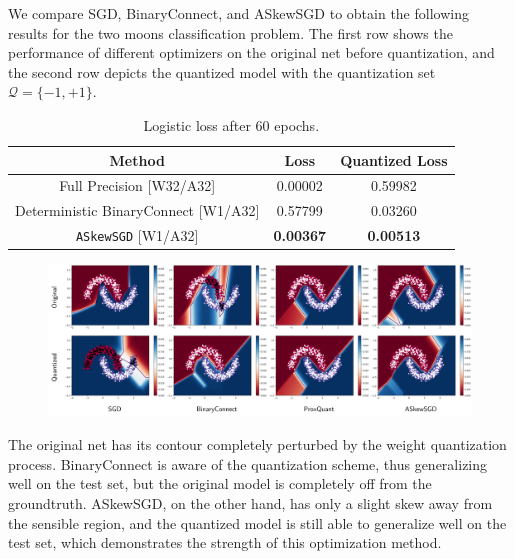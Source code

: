 \documentclass[10pt,a4paper]{article}
\begin{document}
We compare SGD, BinaryConnect, and ASkewSGD to obtain the following results for the two moons classification problem. The first row shows the performance of different optimizers on the original net before quantization, and the second row depicts the quantized model with the quantization set $\mathcal{Q}=\{-1,+1\}$.

\begin{table}[H]
  \caption{Logistic loss after 60 epochs.} \label{Tb:tb1}
  \begin{center}
    \begin{tabular}{ccc}
      \hline
      Method                               & Loss             & Quantized Loss   \\ \hline
      Full Precision [W32/A32]             & 0.00002          & 0.59982          \\ \hline
      Deterministic BinaryConnect [W1/A32] & 0.57799          & 0.03260          \\
      \texttt{ASkewSGD} [W1/A32]           & \textbf{0.00367} & \textbf{0.00513} \\ \hline
    \end{tabular}
  \end{center}
\end{table}
\begin{figure}[H]
  \centering
  \includegraphics[width=0.7\linewidth]{twomoonstest.png}
\end{figure}
The original net has its contour completely perturbed by the weight quantization process. BinaryConnect is aware of the quantization scheme, thus generalizing well on the test set, but the original model is completely off from the groundtruth. ASkewSGD, on the other hand, has only a slight skew away from the sensible region, and the quantized model is still able to generalize well on the test set, which demonstrates the strength of this optimization method.
\end{document}
